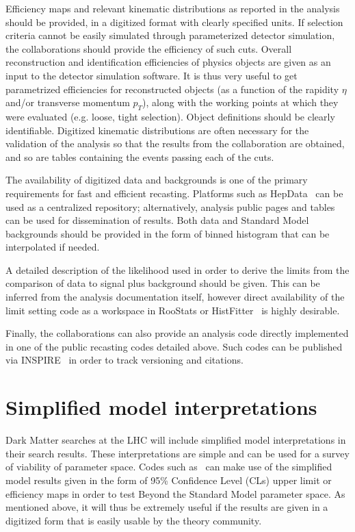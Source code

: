 Efficiency maps and relevant kinematic distributions as reported in the analysis should be provided, in a digitized format with clearly specified units.
If selection criteria cannot be easily simulated through parameterized detector simulation, the collaborations should provide the efficiency of such cuts. 
Overall reconstruction and identification efficiencies of physics objects are given as an input to the detector simulation software. 
It is thus very useful to get parametrized efficiencies for reconstructed objects (as a function of the rapidity $\eta$ and/or transverse momentum $p_T$), 
along with the working points at which they were evaluated (e.g. loose, tight selection). Object definitions should be clearly identifiable. 
Digitized kinematic distributions are often necessary for the validation of the analysis so that the results from the collaboration are obtained, 
and so are tables containing the events passing each of the cuts. 

The availability of digitized data and backgrounds is one of the primary requirements for fast and efficient recasting. 
Platforms such as HepData~\cite{HEPData_doc} can be used as a centralized repository; alternatively, analysis public pages and tables can be used
for dissemination of results. Both data and Standard Model backgrounds should be provided in the form of binned histogram that can be interpolated if needed. 

A detailed description of the likelihood used in order to derive the limits from the comparison of data to signal plus background should be given. 
This can be inferred from the analysis documentation itself, however direct availability of the limit setting code as a workspace in RooStats or HistFitter~\cite{Baak:2014wma} is highly desirable. 

Finally, the collaborations can also provide an analysis code directly implemented in one of the public recasting codes detailed above. 
Such codes can be published via INSPIRE~\cite{INSPIRE} in order to track versioning and citations. 

\section{Simplified model interpretations}

Dark Matter searches at the LHC will include simplified model interpretations in their search results. These interpretations are simple and can be used for a survey of viability of parameter space. Codes such as~\cite{Kraml:2013mwa, Kraml:2014sna, Papucci:2014rja} can make use of the simplified model results given in the form of 95\% Confidence Level (CLs) upper limit  or efficiency maps in order to test Beyond the Standard Model parameter space. As mentioned above, it will thus be extremely useful if the results are given in a digitized form that is easily usable by the theory community. 

